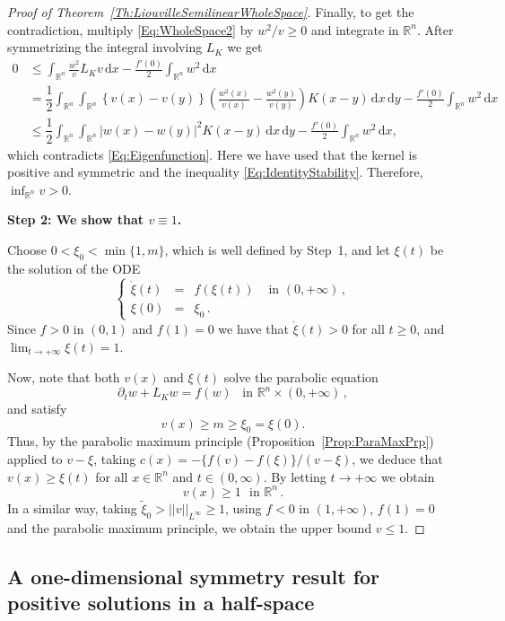 \documentclass[12pt,reqno]{amsart}
\theoremstyle{definition}
\theoremstyle{remark}
\newcommand{\con}[1]{\mathbb{#1}}
\newcommand{\R}{\con{R}} %
\newcommand{\norm}[1]{\left | \left |{#1} \right | \right |}
\renewcommand{\d}{\,\mathrm{d}} %
\newcommand\beqc[1]{\left\{\begin{array}{#1}}
\newcommand\eeqc{\end{array} \right.}
\def\PDEsystem{rcll}
\def\ds{\displaystyle}
\numberwithin{equation}{section}
\begin{document}
\begin{proof}[Proof of Theorem~\ref{Th:LiouvilleSemilinearWholeSpace}]
	Finally, to get the contradiction, multiply \eqref{Eq:WholeSpace2} by $w^2/v\geq 0$ and integrate in $\R^n$. After symmetrizing the integral involving $L_K$ we get
	\begin{align*}
	0 &\leq \int_{\R^n} \frac{w^2}{v}  L_K v \d x - \frac{f'(0)}{2}\int_{\R^n} w^2 \d x \\
	&= \dfrac{1}{2}\int_{\R^n}\int_{\R^n}\left\{ v(x)-v(y) \right\} \left( \frac{w^2(x)}{v(x)}-\frac{w^2(y)}{v(y)} \right) K(x-y) \d x \d y - \frac{f'(0)}{2}\int_{\R^n} w^2 \d x \\
	&\leq \dfrac{1}{2} \int_{\R^n}\int_{\R^n} |w(x)-w(y)|^2 K(x-y) \d x \d y - \frac{f'(0)}{2}\int_{\R^n} w^2 \d x ,
	\end{align*}
	which contradicts \eqref{Eq:Eigenfunction}. Here we have used that the kernel is positive and symmetric and the inequality \eqref{Eq:IdentityStability}. Therefore, $\inf_{\R^n} v >0$.
	
	\textbf{Step 2: We show that $v\equiv 1$.}
	
	Choose $0<\xi_0<\min\{1,m\}$, which is well defined by Step~1, and let $\xi(t)$ be the solution of the ODE
	$$
	\beqc{\PDEsystem}
	\dot{\xi}(t) &=& f(\xi(t)) & \textrm{ in }(0,+\infty)\,,\\
	\xi(0) &=& \xi_0\,.
	\eeqc
	$$
	Since $f>0$ in $(0,1)$ and $f(1) = 0$ we have that $\dot{\xi}(t)>0$ for all $t\geq 0$, and $\ds \lim_{t\to +\infty} \xi(t) = 1$.
	
	Now, note that both $v(x)$ and $\xi(t)$ solve the parabolic equation
	$$ \partial_t w + L_K w = f(w) \,\,\, \textrm{ in }\R^n\times (0,+\infty)\,, $$
	and satisfy
	$$ v(x) \geq m \geq \xi_0 = \xi(0). $$
	Thus, by the parabolic maximum principle (Proposition~\ref{Prop:ParaMaxPrp}) applied to $v-\xi$, taking $c(x) = -\{f(v)-f(\xi)\}/(v-\xi)$, we deduce that $v(x)\geq \xi(t)$ for all $x\in\R^n$ and $t\in(0,\infty)$. By letting $t \to +\infty$ we obtain
	$$
	v(x) \geq 1 \,\, \textrm{ in }\R^n\,.  
	$$
	In a similar way, taking $\tilde{\xi}_0>\norm{v}_{L^\infty} \geq 1$, using $f<0$ in $(1,+\infty)$, $f(1)=0$ and the parabolic maximum principle, we obtain the upper bound $v\leq 1$.
\end{proof}



\subsection{A one-dimensional symmetry result for positive solutions in a half-space}
\end{document}
